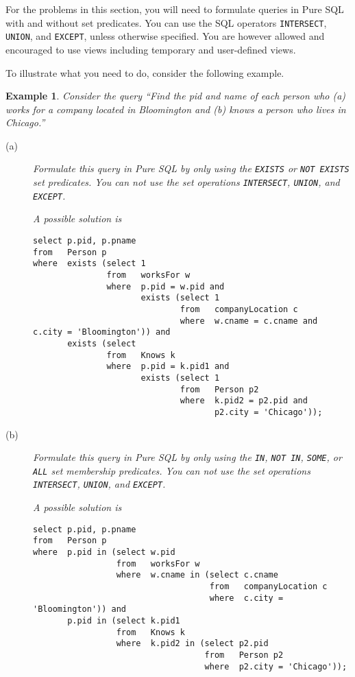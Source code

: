 \documentclass[11pt]{article}
\newtheorem{example}{Example}
\begin{document}
For the problems in this section, you will need to formulate queries in {Pure SQL} with and without set predicates.
You can use the SQL operators {\tt INTERSECT}, {\tt UNION}, and {\tt EXCEPT}, unless otherwise specified.
You are however allowed and  encouraged to use views including temporary and user-defined views.

To illustrate what you need to do, consider the following example.
\begin{example}\label{PureSQLquery}
Consider the query ``\emph{Find the pid and name of each person who (a)
works for a company located in Bloomington  and (b)
knows a person who lives in Chicago.}''

\begin{description}
\item[(a)]   Formulate this query in Pure SQL by only using the {\tt EXISTS} or {\tt NOT EXISTS} set predicates.
You can not use the set operations {\tt INTERSECT}, {\tt UNION}, and {\tt EXCEPT}.

A possible solution is
{\footnotesize
\begin{verbatim}
select p.pid, p.pname
from   Person p
where  exists (select 1
               from   worksFor w
               where  p.pid = w.pid and
                      exists (select 1
                              from   companyLocation c
                              where  w.cname = c.cname and c.city = 'Bloomington')) and
       exists (select
               from   Knows k
               where  p.pid = k.pid1 and
                      exists (select 1
                              from   Person p2
                              where  k.pid2 = p2.pid and
                                     p2.city = 'Chicago'));
\end{verbatim}
}

\item[(b)]   Formulate this query in Pure SQL by only using the {\tt  IN}, {\tt NOT IN}, {\tt SOME}, or {\tt ALL} set membership predicates.
You can not use the set operations {\tt INTERSECT}, {\tt UNION}, and {\tt EXCEPT}.

A possible solution is
{\footnotesize
\begin{verbatim}
select p.pid, p.pname
from   Person p
where  p.pid in (select w.pid
                 from   worksFor w
                 where  w.cname in (select c.cname
                                    from   companyLocation c
                                    where  c.city = 'Bloomington')) and
       p.pid in (select k.pid1
                 from   Knows k
                 where  k.pid2 in (select p2.pid
                                   from   Person p2
                                   where  p2.city = 'Chicago'));
\end{verbatim}
}


\end{description}
\end{example}
\end{document}
